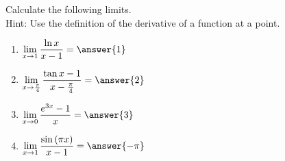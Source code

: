 \documentclass{ximera}
\author{Nela Lakos}
\begin{document}
\begin{exercise}

Calculate the following limits.\\
Hint: Use the definition of the derivative of a function at a point. 
\begin{enumerate}
\item  $\displaystyle \lim_{x \to 1} \dfrac{\ln{x}}{x-1} =\answer{1}$\\
\item$\displaystyle \lim_{x \to \frac{\pi}{4}} \dfrac{\tan{x}-1}{x-\frac{\pi}{4}} =\answer{2}$\\
\item$\displaystyle \lim_{x \to 0} \dfrac{e^{3x}-1}{x} =\answer{3}$\\
\item$\displaystyle \lim_{x \to 1} \dfrac{\sin{(\pi x)}}{x-1} =\answer{-\pi}$\\
\end{enumerate}
\end{exercise}
\end{document}
